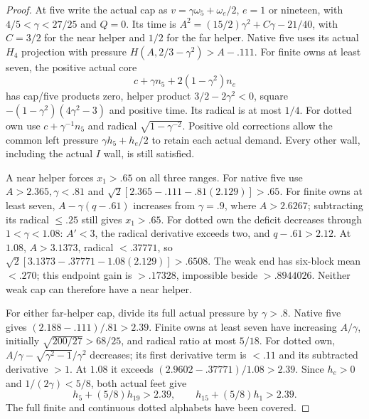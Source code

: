 \documentclass[11pt]{article}
\theoremstyle{definition}
\theoremstyle{remark}
\begin{document}
\begin{proof}
At five write the actual cap as $v=\gamma\omega_5+\omega_e/2$,
$e=1$ or nineteen, with $4/5<\gamma<27/25$ and $Q=0$.
Its time is $A^2=(15/2)\gamma^2+C\gamma-21/40$, with
$C=3/2$ for the near helper and $1/2$ for the far helper.
Native five uses its actual $H_4$ projection with pressure
$H(A,2/3-\gamma^2)>A-.111$.
For finite owns at least seven, the positive actual core
\[
 c+\gamma n_5+2(1-\gamma^2)n_e
\]
has cap/five products zero, helper product $3/2-2\gamma^2<0$,
square $-(1-\gamma^2)(4\gamma^2-3)$ and positive time.
Its radical is at most $1/4$. For dotted own use
$c+\gamma^{-1}n_5$ and radical $\sqrt{1-\gamma^{-2}}$.
Positive old corrections allow the common left pressure
$\gamma h_5+h_e/2$ to retain each actual demand. Every other
wall, including the actual $I$ wall, is still satisfied.

A near helper forces $x_1>.65$ on all three ranges.
For native five use $A>2.365,\gamma<.81$ and
$\sqrt2[2.365-.111-.81(2.129)]>.65$.
For finite owns at least seven, $A-\gamma(q-.61)$ increases
from $\gamma=.9$, where $A>2.6267$; subtracting its radical
$\le.25$ still gives $x_1>.65$.
For dotted own the deficit decreases through $1<\gamma<1.08$:
$A'<3$, the radical derivative exceeds two, and $q-.61>2.12$.
At $1.08$, $A>3.1373$, radical $<.37771$, so
$\sqrt2[3.1373-.37771-1.08(2.129)]>.6508$.
The weak end has six-block mean $<.270$; this endpoint gain is
$>.17328$, impossible beside $>.8944026$. Neither weak cap
can therefore have a near helper.

For either far-helper cap, divide its full actual pressure by
$\gamma>.8$. Native five gives $(2.188-.111)/.81>2.39$.
Finite owns at least seven have increasing $A/\gamma$, initially
$\sqrt{200/27}>68/25$, and radical ratio at most $5/18$.
For dotted own, $A/\gamma-\sqrt{\gamma^2-1}/\gamma^2$ decreases;
its first derivative term is $<.11$ and its subtracted derivative
$>1$. At $1.08$ it exceeds $(2.9602-.37771)/1.08>2.39$.
Since $h_e>0$ and $1/(2\gamma)<5/8$, both actual feet give
\[
 h_5+(5/8)h_{19}>2.39,\qquad
 h_{15}+(5/8)h_1>2.39.
\]
The full finite and continuous dotted alphabets have been covered.


\end{proof}
\end{document}
